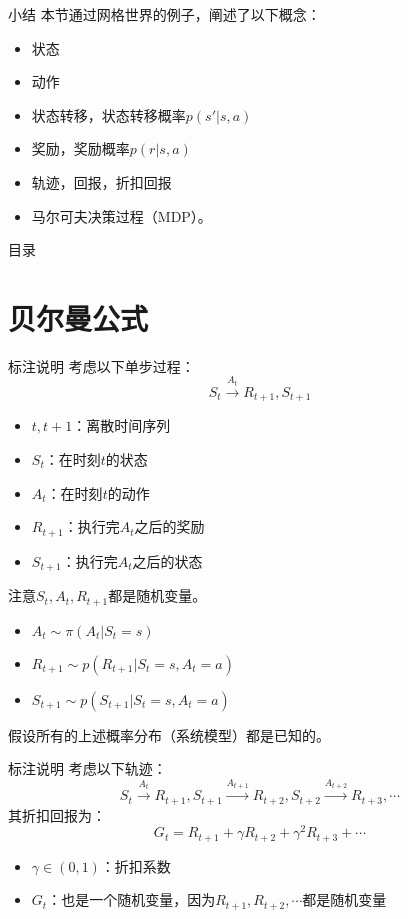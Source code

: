 \documentclass[aspectratio=169,xcolor=dvipsnames]{beamer}
\begin{document}
\begin{frame}{小结}
    本节通过网格世界的例子，阐述了以下概念：
    \begin{itemize}
        \item 状态
        \item 动作
        \item 状态转移，状态转移概率$p(s'|s, a)$
        \item 奖励，奖励概率$p(r|s,a)$
        \item 轨迹，回报，折扣回报
        \item 马尔可夫决策过程（MDP）。
    \end{itemize}
\end{frame}

\begin{frame}{目录}
    \tableofcontents
\end{frame}

\section{贝尔曼公式}

\begin{frame}{标注说明}
    考虑以下单步过程：
    \[
        S_t\xrightarrow{A_t}R_{t+1},S_{t+1}
    \]
    \begin{itemize}
        \item $t,t+1$：离散时间序列
        \item $S_t$：在时刻$t$的状态
        \item $A_t$：在时刻$t$的动作
        \item $R_{t+1}$：执行完$A_t$之后的奖励
        \item $S_{t+1}$：执行完$A_t$之后的状态
    \end{itemize}
    注意$S_t,A_t,R_{t+1}$都是随机变量。

    \begin{itemize}
        \item $A_t\sim \pi(A_t|S_t=s)$
        \item $R_{t+1}\sim p(R_{t+1}|S_t=s,A_t=a)$
        \item $S_{t+1}\sim p(S_{t+1}|S_t=s,A_t=a)$
    \end{itemize}
    假设所有的上述概率分布（系统模型）都是已知的。
\end{frame}

\begin{frame}{标注说明}
    考虑以下轨迹：
    \[
        S_t\xrightarrow{A_t}R_{t+1},S_{t+1}\xrightarrow{A_{t+1}}R_{t+2},S_{t+2}\xrightarrow{A_{t+2}}R_{t+3},\cdots
    \]
    其折扣回报为：
    \[
        G_t=R_{t+1}+\gamma R_{t+2}+\gamma^2 R_{t+3}+\cdots
    \]
    \begin{itemize}
        \item $\gamma\in(0,1)$：折扣系数
        \item $G_t$：也是一个随机变量，因为$R_{t+1},R_{t+2},\cdots$都是随机变量
    \end{itemize}
\end{frame}
\end{document}
